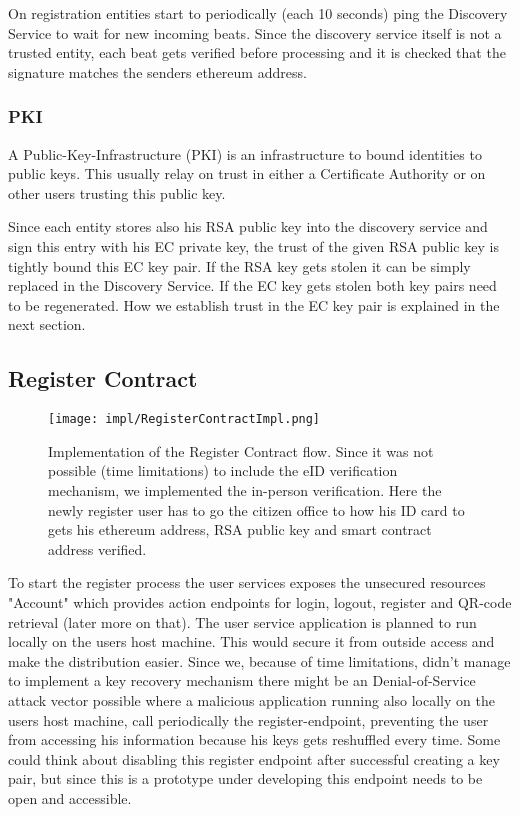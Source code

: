 On registration entities start to periodically (each 10 seconds) ping the Discovery Service to wait for new incoming beats. Since the discovery service itself is not a trusted entity, each beat gets verified before processing and it is checked that the signature matches the senders ethereum address.

\subsubsection{PKI}

A Public-Key-Infrastructure (PKI) is an infrastructure to bound identities to public keys. This usually relay on trust in either a Certificate Authority or on other users trusting this public key. 

Since each entity stores also his RSA public key into the discovery service and sign this entry with his EC private key, the trust of the given RSA public key is tightly bound this EC key pair. If the RSA key gets stolen it can be simply replaced in the Discovery Service. If the EC key gets stolen both key pairs need to be regenerated. How we establish trust in the EC key pair is explained in the next section.

\subsection{Register Contract}
\begin{figure}
\texttt{[image: impl/RegisterContractImpl.png]}
\centering
\caption{Implementation of the Register Contract flow. Since it was not possible (time limitations) to include the eID verification mechanism, we implemented the in-person verification. Here the newly register user has to go the citizen office to how his ID card to gets his ethereum address, RSA public key and smart contract address verified.}
\label{fig:registerContractImpl}
\end{figure}

To start the register process the user services exposes the unsecured resources "Account" which provides action endpoints for login, logout, register and QR-code retrieval (later more on that). The user service application is planned to run locally on the users host machine. This would secure it from outside access and make the distribution easier. Since we, because of time limitations, didn’t manage to implement a key recovery mechanism there might be an Denial-of-Service attack vector possible where a malicious application running also locally on the users host machine, call periodically the register-endpoint, preventing the user from accessing his information because his keys gets reshuffled every time. Some could think about disabling this register endpoint after successful creating a key pair, but since this is a prototype under developing this endpoint needs to be open and accessible. 

